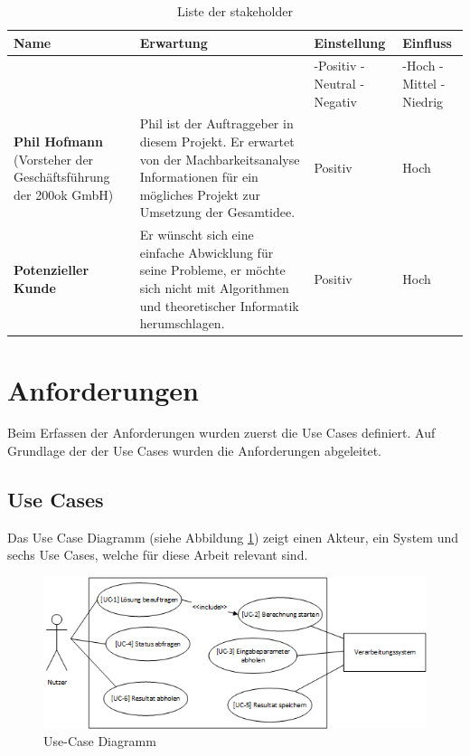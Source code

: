 \begin{table}[ht]
\centering
  \begin{tabular}{ p{5cm} | p{5cm} | p{1.5cm} | p{1.5cm} }
	\hline
	\rowcolor{darkgray}
	\textbf{Name}					&	\textbf{Erwartung}	&	\textbf{Einstellung} 	&	\textbf{Einfluss}	\\ \hline
	\rowcolor{gray}
								&				&	-Positiv \mbox{-Neutral} \mbox{-Negativ} 	&	-Hoch \mbox{-Mittel} \mbox{-Niedrig} \\ \hline
	\textbf{Phil Hofmann} (Vorsteher der Geschäftsführung der 200ok GmbH)						
								&	Phil ist der Auftraggeber in diesem Projekt. Er erwartet von der Machbarkeitsanalyse Informationen für ein mögliches Projekt zur 
									Umsetzung der Gesamtidee.
												& 	Positiv		&	Hoch		\\ \hline
	\textbf{Potenzieller Kunde}
								&	Er wünscht sich eine einfache Abwicklung für seine Probleme, er möchte sich nicht mit Algorithmen und 
									theoretischer Informatik herumschlagen.
												& 	Positiv		&	Hoch		\\ \hline
  \end{tabular}
   \caption{Liste der \gls{stakeholder}}\label{table:stakeholder}
\end{table}

\newpage
\section{Anforderungen}\label{sec.anfoderungen}
Beim Erfassen der Anforderungen wurden zuerst die Use Cases definiert. Auf Grundlage der der Use Cases wurden die Anforderungen abgeleitet.

\subsection{Use Cases}\label{use_cases}
Das Use Case Diagramm (siehe Abbildung \ref{fig:use_case}) zeigt einen Akteur, ein System und sechs Use Cases, welche für diese Arbeit relevant sind.
\begin{figure}[h]
\includegraphics{images/anforderungen/use_cases.png}
\caption[Use-Case Diagramm]{Use-Case Diagramm \selfmade{}}
\label{fig:use_case}
\end{figure}

